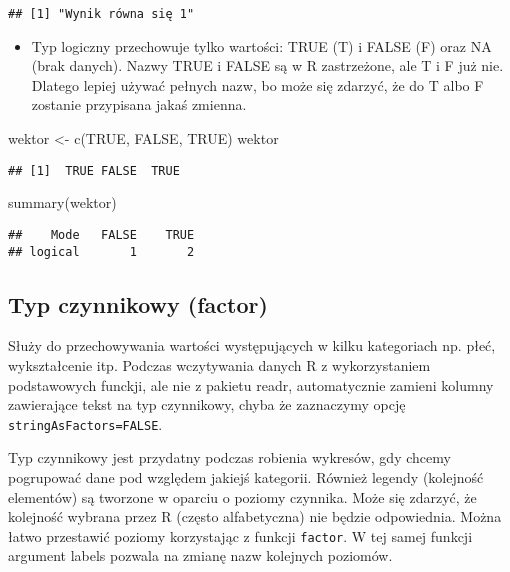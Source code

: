 \documentclass[
]{book}
\newenvironment{Shaded}{\begin{snugshade}}{\end{snugshade}}
\newcommand{\ConstantTok}[1]{\textcolor[rgb]{0.00,0.00,0.00}{#1}}
\newcommand{\FunctionTok}[1]{\textcolor[rgb]{0.00,0.00,0.00}{#1}}
\newcommand{\NormalTok}[1]{#1}
\newcommand{\OtherTok}[1]{\textcolor[rgb]{0.56,0.35,0.01}{#1}}
\providecommand{\tightlist}{%
  \setlength{\itemsep}{0pt}\setlength{\parskip}{0pt}}
\begin{document}
\begin{verbatim}
## [1] "Wynik równa się 1"
\end{verbatim}

\begin{itemize}
\tightlist
\item
  Typ logiczny przechowuje tylko wartości: TRUE (T) i FALSE (F) oraz NA (brak danych). Nazwy TRUE i FALSE są w R zastrzeżone, ale T i F już nie. Dlatego lepiej używać pełnych nazw, bo może się zdarzyć, że do T albo F zostanie przypisana jakaś zmienna.
\end{itemize}

\begin{Shaded}
\begin{Highlighting}[]
\NormalTok{wektor }\OtherTok{\textless{}{-}} \FunctionTok{c}\NormalTok{(}\ConstantTok{TRUE}\NormalTok{, }\ConstantTok{FALSE}\NormalTok{, }\ConstantTok{TRUE}\NormalTok{)}
\NormalTok{wektor}
\end{Highlighting}
\end{Shaded}

\begin{verbatim}
## [1]  TRUE FALSE  TRUE
\end{verbatim}

\begin{Shaded}
\begin{Highlighting}[]
\FunctionTok{summary}\NormalTok{(wektor)}
\end{Highlighting}
\end{Shaded}

\begin{verbatim}
##    Mode   FALSE    TRUE 
## logical       1       2
\end{verbatim}

\hypertarget{typ-czynnikowy-factor}{%
\subsection{Typ czynnikowy (factor)}\label{typ-czynnikowy-factor}}

Służy do przechowywania wartości występujących w kilku kategoriach np. płeć, wykształcenie itp. Podczas wczytywania danych R z wykorzystaniem podstawowych funckji, ale nie z pakietu readr, automatycznie zamieni kolumny zawierające tekst na typ czynnikowy, chyba że zaznaczymy opcję \texttt{stringAsFactors=FALSE}.

Typ czynnikowy jest przydatny podczas robienia wykresów, gdy chcemy pogrupować dane pod względem jakiejś kategorii. Również legendy (kolejność elementów) są tworzone w oparciu o poziomy czynnika. Może się zdarzyć, że kolejność wybrana przez R (często alfabetyczna) nie będzie odpowiednia. Można łatwo przestawić poziomy korzystając z funkcji \texttt{factor}. W tej samej funkcji argument labels pozwala na zmianę nazw kolejnych poziomów.
\end{document}
